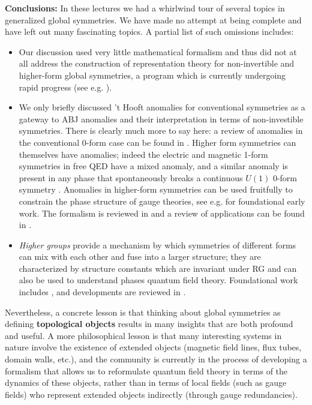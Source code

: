 \documentclass[aps,preprint,nofootinbib,preprintnumbers,eqsecnum,superscriptaddress]{revtex4}
\numberwithin{equation}{section}
\begin{document}
\vspace{2cm} 
{\bf Conclusions:} In these lectures we had a whirlwind tour of several topics in generalized global symmetries. We have made no attempt at being complete and have left out many fascinating topics. A partial list of such omissions includes:
\begin{itemize}
\item Our discussion used very little mathematical formalism and thus did not at all address the construction of representation theory for non-invertible and higher-form global symmetries, a program which is currently undergoing rapid progress (see e.g. \cite{Bhardwaj:2022yxj,Bartsch:2023pzl,Bartsch:2023wvv,Bhardwaj:2023wzd,Bhardwaj:2023ayw}).
\item We only briefly discussed 't Hooft anomalies for conventional symmetries as a gateway to ABJ anomalies and their interpretation in terms of non-investible symmetries. There is clearly much more to say here: a review of anomalies in the conventional 0-form case can be found in \cite{Harvey:2005it}. Higher form symmetries can themselves have anomalies; indeed the electric and magnetic 1-form symmetries in free QED have a mixed anomaly, and a similar anomaly is present in any phase that spontaneously breaks a continuous $U(1)$ 0-form symmetry \cite{Delacretaz:2019brr}. Anomalies in higher-form symmetries can be used fruitfully to constrain the phase structure of gauge theories, see e.g. \cite{Gaiotto:2017yup,Gaiotto:2017tne,Gomis:2017ixy} for foundational early work. The formalism is reviewed in \cite{Bhardwaj:2023kri} and a review of applications can be found in \cite{Brennan:2023mmt}. 
\item {\it Higher groups} provide a mechanism by which symmetries of different forms can mix with each other and fuse into a larger structure; they are characterized by structure constants which are invariant under RG and can also be used to understand phases quantum field theory. Foundational work includes \cite{Bhardwaj:2017xup,Benini:2018reh,Cordova:2018cvg}, and developments are reviewed in \cite{Bhardwaj:2023kri}. 
\end{itemize} 

Nevertheless, a concrete lesson is that thinking about global symmetries as defining {\bf topological objects} results in many insights that are both profound and useful. A more philosophical lesson is that many interesting systems in nature involve the existence of extended objects (magnetic field lines, flux tubes, domain walls, etc.), and the community is currently in the process of developing a formalism that allows us to reformulate quantum field theory in terms of the dynamics of these objects, rather than in terms of local fields (such as gauge fields) who represent extended objects indirectly (through gauge redundancies). 
\end{document}
